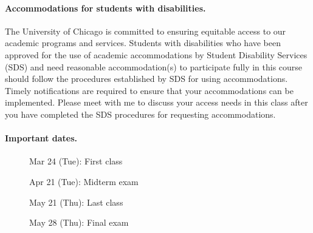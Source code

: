 \documentclass[12pt]{article}
\begin{document}
\paragraph{Accommodations for students with disabilities.}
The University of Chicago is committed to ensuring equitable access to our academic programs and services. Students with disabilities who have been approved for the use of academic accommodations by Student Disability Services (SDS) and need reasonable accommodation(s) to participate fully in this course should follow the procedures established by SDS for using accommodations. Timely notifications are required to ensure that your accommodations can be implemented. Please meet with me to discuss your access needs in this class after you have completed the SDS procedures for requesting accommodations.

\paragraph{Important dates.}
\begin{description}
\item[\phantom{*}] Mar 24 (Tue): First class
\item[\phantom{*}] Apr 21 (Tue): Midterm exam
\item[\phantom{*}] May 21 (Thu): Last class
\item[\phantom{*}] May 28 (Thu): Final exam
\end{description}
\end{document}
